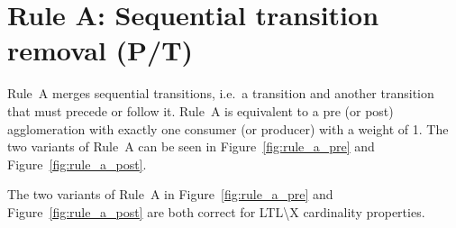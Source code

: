 \section*{Rule A: Sequential transition removal (P/T)}\label{sec:rule_a}
Rule~A merges sequential transitions, i.e.\ a transition and another transition that must precede or follow it.
Rule~A is equivalent to a pre (or post) agglomeration with exactly one consumer (or producer) with a weight of 1.
The two variants of Rule~A can be seen in Figure~\ref{fig:rule_a_pre} and Figure~\ref{fig:rule_a_post}.

\begin{theorem}\label{theorem:rule_a}
    The two variants of Rule~A in Figure~\ref{fig:rule_a_pre} and Figure~\ref{fig:rule_a_post} are both correct for LTL\textbackslash X cardinality properties.
\end{theorem}

